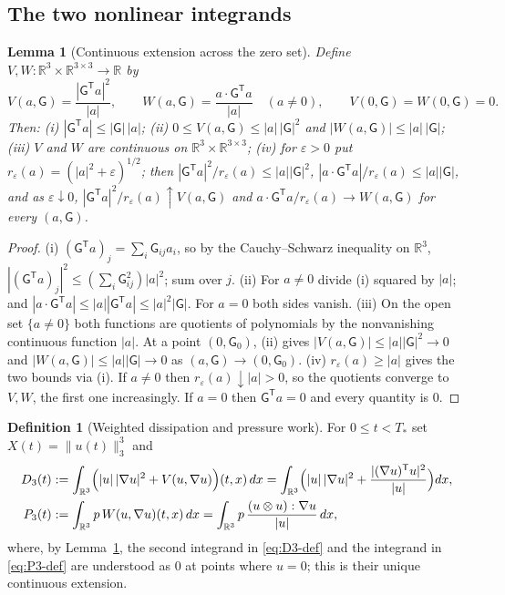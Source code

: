 \documentclass[11pt]{article}
\newtheorem{lemma}[theorem]{Lemma}
\theoremstyle{definition}
\newtheorem{definition}[theorem]{Definition}
\theoremstyle{plain}
\newcommand{\R}{\mathbb R}
\newcommand{\norm}[1]{\lVert #1\rVert}
\begin{document}
\subsection*{The two nonlinear integrands}

\begin{lemma}[Continuous extension across the zero set]\label{lem:integrands}
Define $V,W:\R^3\times\R^{3\times3}\to\R$ by
\[
 V(a,\mathsf G)=\frac{|\mathsf G^{\mathsf T}a|^2}{|a|},\qquad
 W(a,\mathsf G)=\frac{a\cdot\mathsf G^{\mathsf T}a}{|a|}\quad(a\neq0),
 \qquad V(0,\mathsf G)=W(0,\mathsf G)=0 .
\]
Then: (i) $|\mathsf G^{\mathsf T}a|\leq|\mathsf G|\,|a|$;
(ii) $0\leq V(a,\mathsf G)\leq|a|\,|\mathsf G|^2$ and
$|W(a,\mathsf G)|\leq|a|\,|\mathsf G|$;
(iii) $V$ and $W$ are continuous on $\R^3\times\R^{3\times3}$;
(iv) for $\varepsilon>0$ put $r_\varepsilon(a)=(|a|^2+\varepsilon)^{1/2}$; then
$|\mathsf G^{\mathsf T}a|^2/r_\varepsilon(a)\leq|a||\mathsf G|^2$,
$|a\cdot\mathsf G^{\mathsf T}a|/r_\varepsilon(a)\leq|a||\mathsf G|$, and as
$\varepsilon\downarrow0$,
$|\mathsf G^{\mathsf T}a|^2/r_\varepsilon(a)\uparrow V(a,\mathsf G)$ and
$a\cdot\mathsf G^{\mathsf T}a/r_\varepsilon(a)\to W(a,\mathsf G)$ for
every $(a,\mathsf G)$.
\end{lemma}

\begin{proof}
(i) $(\mathsf G^{\mathsf T}a)_j=\sum_i\mathsf G_{ij}a_i$, so by the
Cauchy--Schwarz inequality on $\R^3$,
$|(\mathsf G^{\mathsf T}a)_j|^2\leq(\sum_i\mathsf G_{ij}^2)|a|^2$; sum over $j$.
(ii) For $a\neq0$ divide (i) squared by $|a|$; and
$|a\cdot\mathsf G^{\mathsf T}a|\leq|a||\mathsf G^{\mathsf T}a|\leq|a|^2|\mathsf G|$.
For $a=0$ both sides vanish.
(iii) On the open set $\{a\neq0\}$ both functions are quotients of
polynomials by the nonvanishing continuous function $|a|$.  At a point
$(0,\mathsf G_0)$, (ii) gives $|V(a,\mathsf G)|\leq|a||\mathsf G|^2\to0$ and
$|W(a,\mathsf G)|\leq|a||\mathsf G|\to0$ as $(a,\mathsf G)\to(0,\mathsf G_0)$.
(iv) $r_\varepsilon(a)\geq|a|$ gives the two bounds via (i).  If $a\neq0$
then $r_\varepsilon(a)\downarrow|a|>0$, so the quotients converge to
$V,W$, the first one increasingly.  If $a=0$ then
$\mathsf G^{\mathsf T}a=0$ and every quantity is $0$.
\end{proof}

\begin{definition}[Weighted dissipation and pressure work]\label{def:D3P3}
For $0\leq t<T_*$ set $X(t)=\norm{u(t)}_3^3$ and
\begin{align}
 D_3(t)&:=\int_{\R^3}\Bigl(|u|\,|\nabla u|^2+V(u,\nabla u)\Bigr)(t,x)\,dx
 =\int_{\R^3}\Bigl(|u|\,|\nabla u|^2
   +\frac{|(\nabla u)^{\mathsf T}u|^2}{|u|}\Bigr)dx,\label{eq:D3-def}\\
 P_3(t)&:=\int_{\R^3}p\,W(u,\nabla u)(t,x)\,dx
 =\int_{\R^3}p\,\frac{(u\otimes u):\nabla u}{|u|}\,dx,\label{eq:P3-def}
\end{align}
where, by Lemma~\ref{lem:integrands}, the second integrand in
\eqref{eq:D3-def} and the integrand in \eqref{eq:P3-def} are understood as
$0$ at points where $u=0$; this is their unique continuous extension.
\end{definition}
\end{document}
